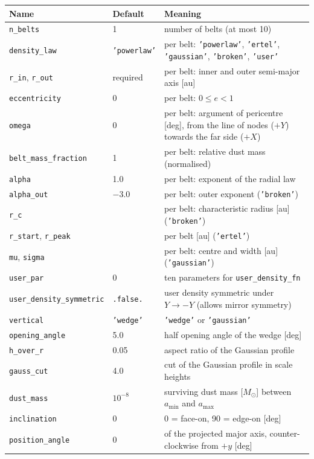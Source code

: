 \documentclass[11pt,a4paper]{article}
\newcommand{\code}[1]{\texttt{#1}}
\newcommand{\Msun}{M_\odot}
\begin{document}
\small
\begin{longtable}{@{}R{4.15cm}R{3.4cm}R{7.45cm}@{}}
\toprule
Name & Default & Meaning \\
\midrule
\endhead
\code{n\_belts} & 1 & number of belts (at most 10) \\
\code{density\_law} & \code{'powerlaw'} & per belt: \code{'powerlaw'}, \code{'ertel'},
  \code{'gaussian'}, \code{'broken'}, \code{'user'} \\
\code{r\_in}, \code{r\_out} & required & per belt: inner and outer semi-major axis [au] \\
\code{eccentricity} & 0 & per belt: $0\le e<1$ \\
\code{omega} & 0 & per belt: argument of pericentre [deg], from the line of nodes ($+Y$) towards
  the far side ($+X$) \\
\code{belt\_mass\_fraction} & 1 & per belt: relative dust mass (normalised) \\
\code{alpha} & 1.0 & per belt: exponent of the radial law \\
\code{alpha\_out} & $-3.0$ & per belt: outer exponent (\code{'broken'}) \\
\code{r\_c} & & per belt: characteristic radius [au] (\code{'broken'}) \\
\code{r\_start}, \code{r\_peak} & & per belt [au] (\code{'ertel'}) \\
\code{mu}, \code{sigma} & & per belt: centre and width [au] (\code{'gaussian'}) \\
\code{user\_par} & 0 & ten parameters for \code{user\_density\_fn} \\
\code{user\_density\_symmetric} & \code{.false.} & user density symmetric under $Y\to-Y$ (allows
  mirror symmetry) \\
\code{vertical} & \code{'wedge'} & \code{'wedge'} or \code{'gaussian'} \\
\code{opening\_angle} & 5.0 & half opening angle of the wedge [deg] \\
\code{h\_over\_r} & 0.05 & aspect ratio of the Gaussian profile \\
\code{gauss\_cut} & 4.0 & cut of the Gaussian profile in scale heights \\
\code{dust\_mass} & $10^{-8}$ & surviving dust mass [$\Msun$] between $a_\mathrm{min}$ and
  $a_\mathrm{max}$ \\
\code{inclination} & 0 & 0 = face-on, 90 = edge-on [deg] \\
\code{position\_angle} & 0 & of the projected major axis, counter-clockwise from $+y$ [deg] \\
\bottomrule
\end{longtable}
\normalsize
\end{document}
